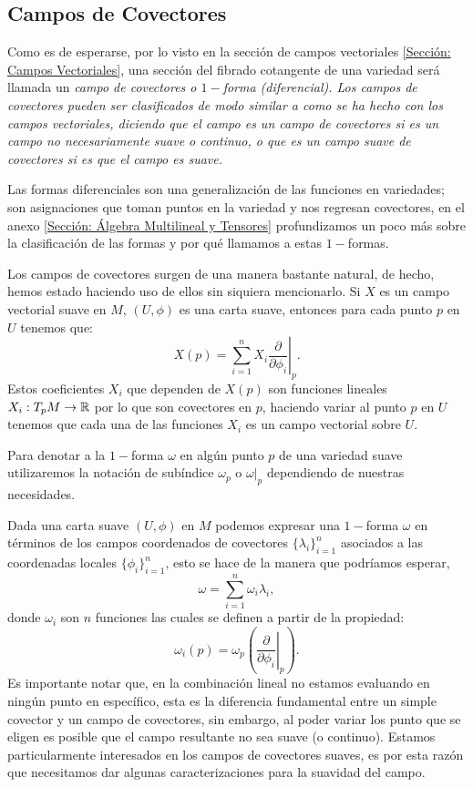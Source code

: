 \subsection{Campos de Covectores}\label{Subsección: Campos de Covectores}
Como es de esperarse, por lo visto en la sección de campos vectoriales \ref{Sección: Campos Vectoriales}, una sección del fibrado cotangente de una variedad será llamada un \it{campo de covectores} o \it{$1-$forma (diferencial)}. Los campos de covectores pueden ser clasificados de modo similar a como se ha hecho con los campos vectoriales, diciendo que el campo es un \it{campo de covectores} si es un campo no necesariamente suave o continuo, o que es un \it{campo suave de covectores} si es que el campo es suave.

Las formas diferenciales son una generalización de las funciones en variedades; son asignaciones que toman puntos en la variedad y nos regresan covectores, en el anexo \ref{Sección: Álgebra Multilineal y Tensores} profundizamos un poco más sobre la clasificación de las formas y por qué llamamos a estas $1-$formas.

Los campos de covectores surgen de una manera bastante natural, de hecho, hemos estado haciendo uso de ellos sin siquiera mencionarlo. Si $X$ es un campo vectorial suave en $M$, $(U, \phi)$ es una carta suave, entonces para cada punto $p$ en $U$ tenemos que:
\[
	X(p) = \sum_{i=1}^{n} X_i \left. \frac{\partial}{\partial \phi_i} \right|_{p}.
\]
Estos coeficientes $X_i$ que dependen de $X(p)$ son funciones lineales $X_i: T_{p}M \to \mathbb{R}$ por lo que son covectores en $p$, haciendo variar al punto $p$ en $U$ tenemos que cada una de las funciones $X_i$ es un campo vectorial sobre $U$.

Para denotar a la $1-$forma $\omega$ en algún punto $p$ de una variedad suave utilizaremos la notación de subíndice $\omega_p$ o $\omega|_{p}$ dependiendo de nuestras necesidades.

Dada una carta suave $(U,\phi)$ en $M$ podemos expresar una $1-$forma $\omega$ en términos de los campos coordenados de covectores $\{\lambda_i\}_{i=1}^n$ asociados a las coordenadas locales $\{\phi_i\}_{i=1}^n$, esto se hace de la manera que podríamos esperar,
\[
	\omega = \sum_{i=1}^{n} \omega_i \lambda_i,
\]
donde $\omega_i$ son $n$ funciones las cuales se definen a partir de la propiedad:
\[
	\omega_i(p)
	=
	\omega_p \left(\left.
	\frac{\partial}{\partial \phi_i}
	\right|_{p}\right).
\]
Es importante notar que, en la combinación lineal no estamos evaluando en ningún punto en específico, esta es la diferencia fundamental entre un simple covector y un campo de covectores, sin embargo, al poder variar los punto que se eligen es posible que el campo resultante no sea suave (o continuo). Estamos particularmente interesados en los campos de covectores suaves, es por esta razón que necesitamos dar algunas caracterizaciones para la suavidad del campo.

